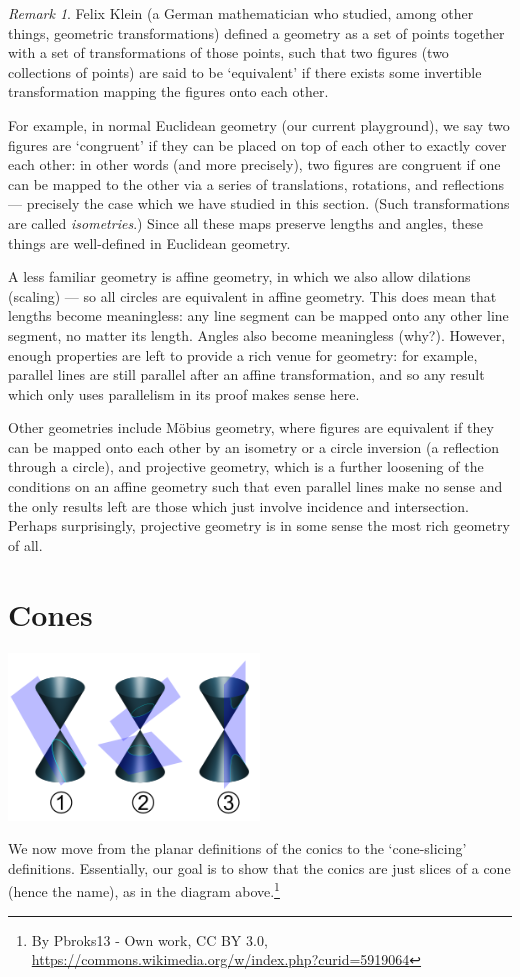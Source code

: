 \documentclass[a4paper,leqno,9pt]{article}
\theoremstyle{exercise}
\theoremstyle{plain}
\theoremstyle{definition}
\theoremstyle{remark}
\newtheorem*{rem}{Remark}
\begin{document}
\begin{rem}
  Felix Klein (a German mathematician who studied, among other things, geometric transformations) defined a geometry
  as a set of points together with a set of transformations of those points, such that two figures (two collections
  of points) are said to be `equivalent' if there exists some invertible transformation mapping the figures onto each other.

  For example, in normal Euclidean geometry (our current playground), we say two figures are `congruent' if they
  can be placed on top of each other to exactly cover each other: in other words (and more precisely), two figures
  are congruent if one can be mapped to the other via a series of translations, rotations, and reflections --- precisely the case
  which we have studied in this section. (Such transformations are called \emph{isometries}.) Since all these maps
  preserve lengths and angles, these things are well-defined in Euclidean geometry.

  A less familiar geometry is affine geometry, in which we also allow dilations (scaling) --- so all circles
  are equivalent in affine geometry. This does mean that lengths become meaningless: any line segment can be
  mapped onto any other line segment, no matter its length. Angles also become meaningless (why?). However, enough
  properties are left to provide a rich venue for geometry: for example, parallel lines are still parallel after an
  affine transformation, and so any result which only uses parallelism in its proof makes sense here.

  Other geometries include M\"obius geometry, where figures are equivalent if they can be mapped onto each other
  by an isometry or a circle inversion (a reflection through a circle), and projective geometry, which is a further
  loosening of the conditions on an affine geometry  such that even parallel lines make no sense and the only results
  left are those which just involve incidence and intersection. Perhaps surprisingly, projective geometry is in
  some sense the most rich geometry of all.
\end{rem}

\section{Cones}
\begin{center}
  \includegraphics[width=0.5\textwidth]{slices}
\end{center}
We now move from the planar definitions of the conics to the `cone-slicing' definitions. Essentially, our goal
is to show that the conics are just slices of a cone (hence the name), as in the diagram above.\footnote{By Pbroks13 - Own work, CC BY 3.0, \url{https://commons.wikimedia.org/w/index.php?curid=5919064}}
\end{document}
